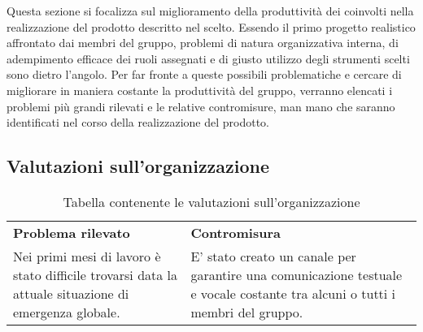 Questa sezione si focalizza sul miglioramento della produttività dei  coinvolti nella
realizzazione del prodotto descritto nel  scelto. Essendo il primo progetto realistico affrontato dai membri del gruppo, problemi di natura organizzativa interna, di adempimento efficace
dei ruoli assegnati e di giusto utilizzo degli strumenti scelti sono dietro l’angolo. Per far fronte a queste
possibili problematiche e cercare di migliorare in maniera costante la produttività del gruppo, verranno elencati i problemi più grandi rilevati e le relative contromisure, man mano che saranno identificati
nel corso della realizzazione del prodotto.

\subsection{Valutazioni sull'organizzazione}
\begin{table} [h!]
	\begin{center}
		\begin{tabular} { m{8cm} m{8cm}  }
			\rowcolor{lightgray}
			\textbf{Problema rilevato} & \textbf{Contromisura}\\
			Nei primi mesi di lavoro è stato difficile trovarsi data la attuale situazione di emergenza globale. & E' stato creato un canale \glock{discord} per garantire una comunicazione testuale e vocale costante tra alcuni o tutti i membri del gruppo.
			
		\end{tabular}
	\end{center}
	\caption{Tabella contenente le valutazioni sull’organizzazione}
\end{table}

\newpage
